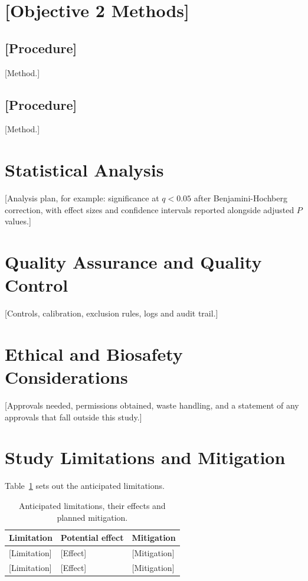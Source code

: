 \section{[Objective 2 Methods]}\label{sec:3.5}

\subsection{[Procedure]}\label{sec:3.5.1}
{[}Method.]

\subsection{[Procedure]}\label{sec:3.5.2}
{[}Method.]

\section{Statistical Analysis}\label{sec:3.6}

{[}Analysis plan, for example: significance at $q<0.05$ after Benjamini-Hochberg correction, with effect sizes and confidence intervals reported alongside adjusted $P$ values.]

\section{Quality Assurance and Quality Control}\label{sec:3.7}
{[}Controls, calibration, exclusion rules, logs and audit trail.]

\section{Ethical and Biosafety Considerations}\label{sec:3.8}
{[}Approvals needed, permissions obtained, waste handling, and a statement of any approvals that fall outside this study.]

\section{Study Limitations and Mitigation}\label{sec:3.9}
Table~\ref{tab:3.2} sets out the anticipated limitations.

\begin{table}[htbp]
  \centering
  \caption{Anticipated limitations, their effects and planned mitigation.}
  \label{tab:3.2}
  \footnotesize
  \begin{tabularx}{\textwidth}{@{}p{} p{} X@{}}
    \toprule
    \textbf{Limitation} & \textbf{Potential effect} & \textbf{Mitigation} \\
    \midrule
    {[}Limitation] & {[}Effect] & {[}Mitigation] \\
    {[}Limitation] & {[}Effect] & {[}Mitigation] \\
    \bottomrule
  \end{tabularx}
\end{table}

